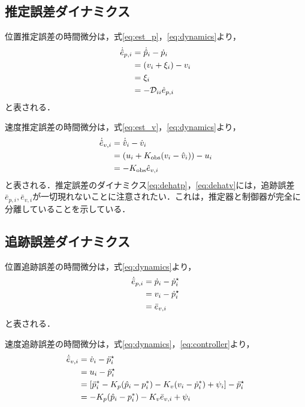 \documentclass[a4paper]{jarticle}
\theoremstyle{definition}
\theoremstyle{remark}
\numberwithin{equation}{section}
\begin{document}
	\subsection{推定誤差ダイナミクス}
	
	位置推定誤差の時間微分は，式\eqref{eq:est_p}，\eqref{eq:dynamics}より，
	\begin{align}
		\dot{\hat{e}}_{p,i} &= \dot{\hat{p}}_i - \dot{p}_i \notag\\
		&= (v_i + \xi_i) - v_i \notag\\
		&= \xi_i \notag\\
		&= -\mathcal{D}_{ii} \hat{e}_{p,i}
		\label{eq:dehatp}
	\end{align}
	と表される．
	
	速度推定誤差の時間微分は，式\eqref{eq:est_v}，\eqref{eq:dynamics}より，
	\begin{align}
		\dot{\hat{e}}_{v,i} &= \dot{\hat{v}}_i - \dot{v}_i \notag\\
		&= (u_i + K_{\mathrm{obs}}(v_i - \hat{v}_i)) - u_i \notag\\
		&= -K_{\mathrm{obs}} \hat{e}_{v,i}
		\label{eq:dehatv}
	\end{align}
	と表される．推定誤差のダイナミクス\eqref{eq:dehatp}，\eqref{eq:dehatv}には，追跡誤差$\bar{e}_{p,i}, \bar{e}_{v,i}$が一切現れないことに注意されたい．これは，推定器と制御器が完全に分離していることを示している．
	
	\subsection{追跡誤差ダイナミクス}
	
	位置追跡誤差の時間微分は，式\eqref{eq:dynamics}より，
	\begin{align}
		\dot{\bar{e}}_{p,i} &= \dot{p}_i - \dot{p}_i^\star \notag\\
		&= v_i - \dot{p}_i^\star \notag\\
		&= \bar{e}_{v,i}
		\label{eq:debarp}
	\end{align}
	と表される．
	
	速度追跡誤差の時間微分は，式\eqref{eq:dynamics}，\eqref{eq:controller}より，
	\begin{align}
		\dot{\bar{e}}_{v,i} &= \dot{v}_i - \ddot{p}_i^\star \notag\\
		&= u_i - \ddot{p}_i^\star \notag\\
		&= [\ddot{p}_i^* - K_p(\hat{p}_i - p_i^*) - K_v(v_i - \dot{p}_i^*) + \psi_i] - \ddot{p}_i^\star \notag\\
		&= -K_p(\hat{p}_i - p_i^*) - K_v \bar{e}_{v,i} + \psi_i
		\label{eq:debarv_pre}
	\end{align}
	
\end{document}
